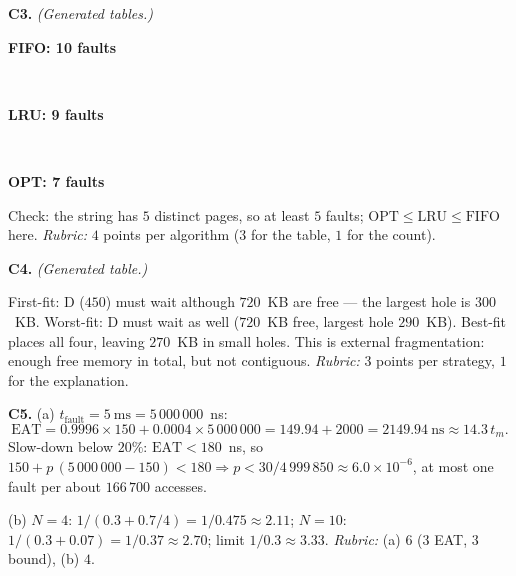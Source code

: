 \documentclass[11pt,a4paper]{article}
\begin{document}
\textbf{C3.} \textit{(Generated tables.)}
\begin{center}
\begin{minipage}{\linewidth}\centering\textbf{FIFO: 10 faults}\\[0.2em]\end{minipage}\\[0.8em]
\begin{minipage}{\linewidth}\centering\textbf{LRU: 9 faults}\\[0.2em]\end{minipage}\\[0.8em]
\begin{minipage}{\linewidth}\centering\textbf{OPT: 7 faults}\\[0.2em]\end{minipage}
\end{center}
Check: the string has $5$ distinct pages, so at least $5$ faults; $\text{OPT} \le \text{LRU} \le \text{FIFO}$ here. \textit{Rubric:} $4$ points per algorithm ($3$ for the table, $1$ for the count).

\textbf{C4.} \textit{(Generated table.)}
\begin{center}\small{}\end{center}
First-fit: D ($450$) must wait although $720$~KB are free --- the largest hole is $300$~KB. Worst-fit: D must wait as well ($720$~KB free, largest hole $290$~KB). Best-fit places all four, leaving $270$~KB in small holes. This is external fragmentation: enough free memory in total, but not contiguous. \textit{Rubric:} $3$ points per strategy, $1$ for the explanation.

\textbf{C5.} (a) $t_{\text{fault}} = 5\ \text{ms} = 5\,000\,000$~ns:
\[
\text{EAT} = 0.9996 \times 150 + 0.0004 \times 5\,000\,000 = 149.94 + 2000 = 2149.94\ \text{ns} \approx 14.3\,t_m .
\]
Slow-down below $20\%$: $\text{EAT} < 180$~ns, so $150 + p\,(5\,000\,000 - 150) < 180 \Rightarrow p < 30/4\,999\,850 \approx 6.0\times10^{-6}$, at most one fault per about $166\,700$ accesses.

(b) $N = 4$: $1/(0.3 + 0.7/4) = 1/0.475 \approx 2.11$; $N = 10$: $1/(0.3 + 0.07) = 1/0.37 \approx 2.70$; limit $1/0.3 \approx 3.33$.
\textit{Rubric:} (a) $6$ ($3$ EAT, $3$ bound), (b) $4$.

\end{document}
